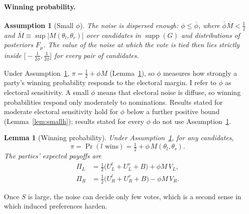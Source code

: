 \documentclass[12pt,letterpaper]{article}
\newtheorem{assumption}{Assumption}
\newtheorem{lemma}{Lemma}
\begin{document}
\paragraph{Winning probability.}
\begin{assumption}[Small $\phi$]\label{ass:small-h}
The noise is dispersed enough: $\phi\le\overline{\phi}$, where $\overline{\phi}\overline{M}<\tfrac12$ and $\overline{M}\equiv\sup|M(\theta_l,\theta_r)|$ over candidates in $\operatorname{supp}(G)$ and distributions of posteriors $F_\mu$. The value of the noise at which the vote is tied then lies strictly inside $\big[-\tfrac{1}{2\phi},\tfrac{1}{2\phi}\big]$ for every pair of candidates.
\end{assumption}

Under Assumption~\ref{ass:small-h}, $\pi=\tfrac12+\phi M$ (Lemma~\ref{lem:win}), so $\phi$ measures how strongly a party's winning probability responds to the electoral margin. I refer to $\phi$ as electoral sensitivity. A small $\phi$ means that electoral noise is diffuse, so winning probabilities respond only moderately to nominations. Results stated for moderate electoral sensitivity hold for $\phi$ below a further positive bound (Lemma~\ref{lem:smallh}); results stated for every $\phi$ do not use Assumption~\ref{ass:small-h}.

\begin{lemma}[Winning probability]\label{lem:win}
Under Assumption~\ref{ass:small-h}, for any candidates,
\[
\pi=\Pr(l\text{ wins})=\tfrac12+\phi\,M(\theta_l,\theta_r).
\]
The parties' expected payoffs are
\begin{align*}
\Pi_L&=\tfrac12\big(U_L^l+U_L^r+B\big)+\phi M\,V_L,\\
\Pi_R&=\tfrac12\big(U_R^l+U_R^r+B\big)-\phi M\,V_R.
\end{align*}
\end{lemma}

Once $S$ is large, the noise can decide only few votes, which is a second sense in which induced preferences harden.
\end{document}

